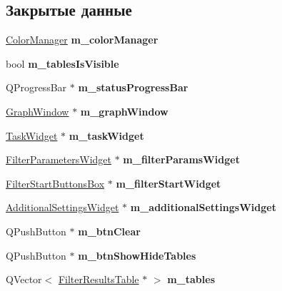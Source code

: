 \subsection*{Закрытые данные}
\begin{DoxyCompactItemize}
\item 
\hypertarget{class_main_window_a6c0331486f528b76b569fc02baf1037e}{}\label{class_main_window_a6c0331486f528b76b569fc02baf1037e} 
\hyperlink{class_color_manager}{Color\+Manager} {\bfseries m\+\_\+color\+Manager}
\item 
\hypertarget{class_main_window_a6ea719792b7699a0d5e81181ba6f5b2c}{}\label{class_main_window_a6ea719792b7699a0d5e81181ba6f5b2c} 
bool {\bfseries m\+\_\+tables\+Is\+Visible}
\item 
\hypertarget{class_main_window_a17685071143ec93292f9e6909ab78901}{}\label{class_main_window_a17685071143ec93292f9e6909ab78901} 
Q\+Progress\+Bar $\ast$ {\bfseries m\+\_\+status\+Progress\+Bar}
\item 
\hypertarget{class_main_window_a7f1ee1494ff008c4a7f6d395ecaac87e}{}\label{class_main_window_a7f1ee1494ff008c4a7f6d395ecaac87e} 
\hyperlink{class_graph_window}{Graph\+Window} $\ast$ {\bfseries m\+\_\+graph\+Window}
\item 
\hypertarget{class_main_window_acc365673b948684fd72adbf4924c0c97}{}\label{class_main_window_acc365673b948684fd72adbf4924c0c97} 
\hyperlink{class_task_widget}{Task\+Widget} $\ast$ {\bfseries m\+\_\+task\+Widget}
\item 
\hypertarget{class_main_window_a463e4f6880ba393e7b8d3de20e7fc96a}{}\label{class_main_window_a463e4f6880ba393e7b8d3de20e7fc96a} 
\hyperlink{class_filter_parameters_widget}{Filter\+Parameters\+Widget} $\ast$ {\bfseries m\+\_\+filter\+Params\+Widget}
\item 
\hypertarget{class_main_window_a88d26017f0ec68df1ec9a8d9cd53fd8a}{}\label{class_main_window_a88d26017f0ec68df1ec9a8d9cd53fd8a} 
\hyperlink{class_filter_start_buttons_box}{Filter\+Start\+Buttons\+Box} $\ast$ {\bfseries m\+\_\+filter\+Start\+Widget}
\item 
\hypertarget{class_main_window_a8e9f2e35383ec89002744d7dd52cb508}{}\label{class_main_window_a8e9f2e35383ec89002744d7dd52cb508} 
\hyperlink{class_additional_settings_widget}{Additional\+Settings\+Widget} $\ast$ {\bfseries m\+\_\+additional\+Settings\+Widget}
\item 
\hypertarget{class_main_window_a00b995ad2a53bd276a53fc137048b278}{}\label{class_main_window_a00b995ad2a53bd276a53fc137048b278} 
Q\+Push\+Button $\ast$ {\bfseries m\+\_\+btn\+Clear}
\item 
\hypertarget{class_main_window_a3fd0f094bf729b91405b14deb7ae4c54}{}\label{class_main_window_a3fd0f094bf729b91405b14deb7ae4c54} 
Q\+Push\+Button $\ast$ {\bfseries m\+\_\+btn\+Show\+Hide\+Tables}
\item 
\hypertarget{class_main_window_aab37e47932ec4fc5002724bdef5f959b}{}\label{class_main_window_aab37e47932ec4fc5002724bdef5f959b} 
Q\+Vector$<$ \hyperlink{class_filter_results_table}{Filter\+Results\+Table} $\ast$ $>$ {\bfseries m\+\_\+tables}
\end{DoxyCompactItemize}


